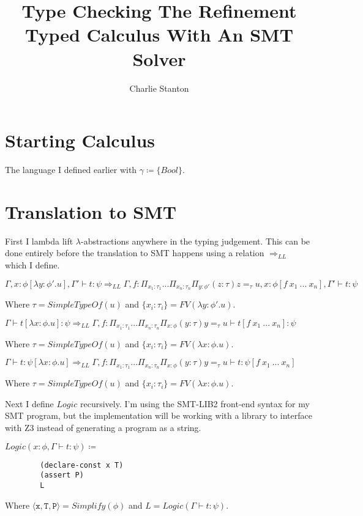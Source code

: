 \documentclass[12pt,a4paper,titlepage]{article}
\title{Type Checking The Refinement Typed Calculus With An SMT Solver}
\author{Charlie Stanton}
\newcommand{\triple}[3]{\langle \texttt{#1} , \texttt{#2} , \texttt{#3} \rangle}
\begin{document}
    \maketitle

    \section{Starting Calculus}
    The language I defined earlier with $\gamma \coloneqq \{Bool\}$.

    \section{Translation to SMT}
    First I lambda lift $\lambda$-abstractions anywhere in the typing judgement.
    This can be done entirely before the translation to SMT happens using a relation $\Rightarrow_{LL}$ which I define.

    $\Gamma, x: \phi[\lambda y: \phi' . u], \Gamma' \vdash t: \psi \Rightarrow_{LL}
    \Gamma, f: \Pi_{x_1: \tau_1} ... \Pi_{x_n: \tau_n} \Pi_{y: \phi'} (z: \tau) z =_\tau u, x: \phi[f\ x_1\ ...\ x_n], \Gamma' \vdash t: \psi$

    Where $\tau = SimpleTypeOf(u)$ and $\{x_i: \tau_i\} = FV(\lambda y: \phi' . u)$.

    $\Gamma \vdash t[\lambda x: \phi . u]: \psi \Rightarrow_{LL}
    \Gamma, f: \Pi_{x_1: \tau_1} ... \Pi_{x_n: \tau_n} \Pi_{x: \phi} (y: \tau) y =_\tau u \vdash t[f\ x_1\ ...\ x_n]: \psi$

    Where $\tau = SimpleTypeOf(u)$ and $\{x_i: \tau_i\} = FV(\lambda x: \phi . u)$.

    $\Gamma \vdash t: \psi[\lambda x: \phi . u] \Rightarrow_{LL}
    \Gamma, f: \Pi_{x_1: \tau_1} ... \Pi_{x_n: \tau_n} \Pi_{x: \phi} (y: \tau) y =_\tau u \vdash t: \psi[f\ x_1\ ...\ x_n]$

    Where $\tau = SimpleTypeOf(u)$ and $\{x_i: \tau_i\} = FV(\lambda x: \phi . u)$.

    Next I define $Logic$ recursively.
    I'm using the SMT-LIB2 front-end syntax for my SMT program, but the implementation will be working with
    a library to interface with Z3 instead of generating a program as a string.

    $Logic(x: \phi, \Gamma \vdash t: \psi) \coloneqq$
    \begin{verbatim}
        (declare-const x T)
        (assert P)
        L
    \end{verbatim}
    Where $\triple{x}{T}{P} = Simplify(\phi)$ and $L = Logic(\Gamma \vdash t: \psi)$.
\end{document}
